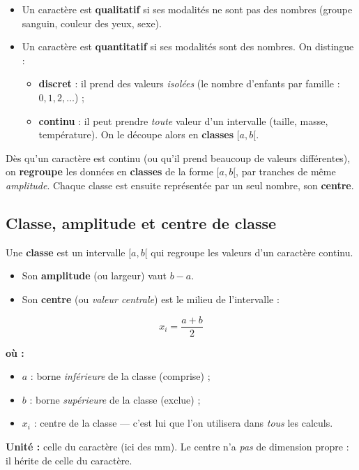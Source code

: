 \documentclass[11pt,a4paper]{article}
\newenvironment{ou}{%
  \par\smallskip\noindent\textbf{où :}\nopagebreak
  \begin{itemize}[leftmargin=1.8em,topsep=2pt,itemsep=1.5pt,parsep=0pt]}%
  {\end{itemize}}
\begin{document}
\begin{definition}
\begin{itemize}[leftmargin=1.5em,topsep=2pt,itemsep=2pt]
  \item Un caractère est \textbf{qualitatif} si ses modalités ne sont pas des nombres
        (groupe sanguin, couleur des yeux, sexe).
  \item Un caractère est \textbf{quantitatif} si ses modalités sont des nombres. On distingue :
    \begin{itemize}[leftmargin=1.4em,topsep=1pt,itemsep=0pt]
      \item \textbf{discret} : il prend des valeurs \emph{isolées} (le nombre d'enfants par famille :
            $0,1,2,\ldots$) ;
      \item \textbf{continu} : il peut prendre \emph{toute} valeur d'un intervalle (taille, masse,
            température). On le découpe alors en \textbf{classes} $[a,b[$.
    \end{itemize}
\end{itemize}
\end{definition}

\begin{attention}
Dès qu'un caractère est continu (ou qu'il prend beaucoup de valeurs différentes), on \textbf{regroupe}
les données en \textbf{classes} de la forme $[a,b[$, par tranches de même \emph{amplitude}. Chaque
classe est ensuite représentée par un seul nombre, son \textbf{centre}.
\end{attention}

\subsection{Classe, amplitude et centre de classe}

\begin{definition}
Une \textbf{classe} est un intervalle $[a,b[$ qui regroupe les valeurs d'un caractère continu.
\begin{itemize}[leftmargin=1.5em,topsep=1pt,itemsep=1pt]
  \item Son \textbf{amplitude} (ou largeur) vaut $b-a$.
  \item Son \textbf{centre} (ou \emph{valeur centrale}) est le milieu de l'intervalle :
\end{itemize}
\end{definition}

\begin{formule}
\[
x_i=\dfrac{a+b}{2}
\]
\begin{ou}
  \item $a$ : borne \emph{inférieure} de la classe (comprise) ;
  \item $b$ : borne \emph{supérieure} de la classe (exclue) ;
  \item $x_i$ : centre de la classe --- c'est lui que l'on utilisera dans \emph{tous} les calculs.
\end{ou}
\textbf{Unité :} celle du caractère (ici des mm). Le centre n'a \emph{pas} de dimension propre :
il hérite de celle du caractère.
\end{formule}
\end{document}
